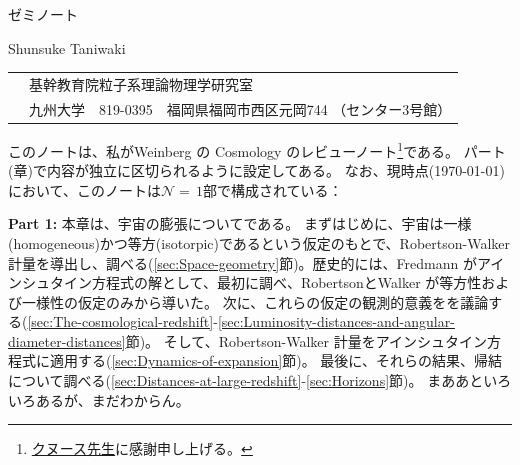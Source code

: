 \documentclass[11pt]{ltjsarticle}
\theoremstyle{plain}
\theoremstyle{break}
\def\Nequals#1{$\mathcal{N}{=}\,#1$}
\begin{document}
\begin{flushright}
ゼミノート
\end{flushright}

\vskip 4cm

\begin{center}

{\Large {}}


\vskip 1cm
 Shunsuke Taniwaki
\vskip 1cm

\begin{tabular}{ll}
  & 基幹教育院粒子系理論物理学研究室\\
  & 九州大学　819-0395　福岡県福岡市西区元岡744 （センター3号館）
\end{tabular}

\vskip 1cm

\end{center}

\noindent
このノートは、私がWeinberg の Cosmology のレビューノート\footnote{\href{https://en.wikipedia.org/wiki/Donald_Knuth}{クヌース先生}に感謝申し上げる。
}である。
パート(章)で内容が独立に区切られるように設定してある。
なお、現時点(\today)において、このノートは\Nequals{1}部で構成されている：

\smallskip

\noindent\textbf{Part 1:}
本章は、宇宙の膨張についてである。
まずはじめに、宇宙は一様(homogeneous)かつ等方(isotorpic)であるという仮定のもとで、Robertson-Walker 計量を導出し、調べる(\ref{sec:Space-geometry}節)。歴史的には、Fredmann がアインシュタイン方程式の解として、最初に調べ、RobertsonとWalker が等方性および一様性の仮定のみから導いた。
次に、これらの仮定の観測的意義をを議論する(\ref{sec:The-cosmological-redshift}-\ref{sec:Luminosity-distances-and-angular-diameter-distances}節)。
そして、Robertson-Walker 計量をアインシュタイン方程式に適用する(\ref{sec:Dynamics-of-expansion}節)。
最後に、それらの結果、帰結について調べる(\ref{sec:Distances-at-large-redshift}-\ref{sec:Horizons}節)。
まああといろいろあるが、まだわからん。





\setcounter{tocdepth}{3}
\tableofcontents

\newpage
%

\setcounter{section}{-1}
\end{document}
